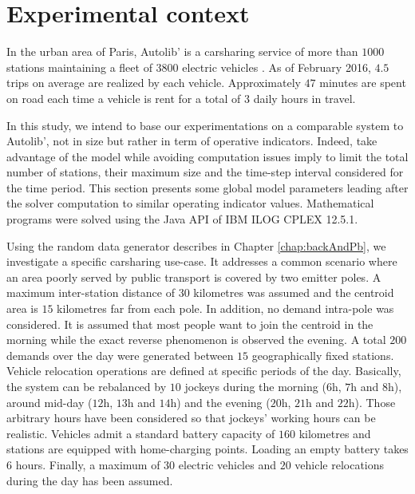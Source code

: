 \section{Experimental context} \label{sec:energyExp:context}
In the urban area of Paris, Autolib' is a carsharing service of more than $1000$ stations maintaining a fleet of $3800$ electric vehicles \cite{autolib_chiffres_2016}.
As of February 2016, $4.5$ trips on average are realized by each vehicle.
Approximately $47$ minutes are spent on road each time a vehicle is rent for a total of $3$ daily hours in travel.

\medskip
In this study, we intend to base our experimentations on a comparable system to Autolib', not in size but rather in term of operative indicators.
Indeed, take advantage of the {\ENERGY} model while avoiding computation issues imply to limit the total number of stations, their maximum size and the time-step interval considered for the time period. %
This section presents some global model parameters leading after the solver computation to similar operating indicator values.
Mathematical programs were solved using the Java API of IBM ILOG CPLEX 12.5.1.

\medskip
Using the random data generator describes in Chapter \ref{chap:backAndPb}, we investigate a specific carsharing use-case.
It addresses a common scenario where an area poorly served by public transport is covered by two emitter poles.
A maximum inter-station distance of $30$ kilometres was assumed and the centroid area is $15$ kilometres far from each pole.
In addition, no demand intra-pole was considered.
It is assumed that most people want to join the centroid in the morning while the exact reverse phenomenon is observed the evening.
A total $200$ demands over the day were generated between $15$ geographically fixed stations.
Vehicle relocation operations are defined at specific periods of the day.
Basically, the system can be rebalanced by $10$ jockeys during the morning ($6$h, $7$h and $8$h), around mid-day ($12$h, $13$h and $14$h) and the evening ($20$h, $21$h and $22$h).
Those arbitrary hours have been considered so that jockeys' working hours can be realistic.
Vehicles admit a standard battery capacity of $160$ kilometres and stations are equipped with home-charging points.
Loading an empty battery takes $6$ hours.
Finally, a maximum of $30$ electric vehicles and $20$ vehicle relocations during the day has been assumed.

